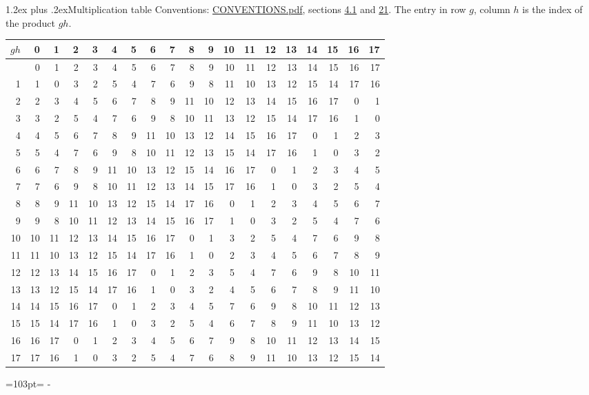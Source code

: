 \documentclass[10pt,a4paper]{article}
\makeatletter
\renewcommand\section{\@startsection{section}{1}{\z@}{-3ex plus -1ex minus -.2ex}%
  {1.2ex plus .2ex}{\normalfont\large\sffamily\bfseries\color{parttitle}}}
\newcommand{\needspace}[1]{\par\penalty-100\begingroup\dimen0=#1\relax\dimen2=\pagegoal
  \advance\dimen2-\pagetotal\ifdim\dimen0>\dimen2\relax\ifdim\dimen2>0pt\vfil\break\fi\fi
  \endgroup}
\numberwithin{equation}{section}
\makeatother
\begin{document}
\section{Multiplication table}\label{s:multiplication}
Conventions: \href{../../CONVENTIONS.pdf}{CONVENTIONS.pdf}, sections \href{../../../rotation/CONVENTIONS.pdf\#conv.4.1}{4.1} and \href{../../CONVENTIONS.pdf\#conv.21}{21}.
The entry in row $g$, column $h$ is the index of the product $gh$.
{\normalsize\setlength{\tabcolsep}{0.1em}\setlength{\LTleft}{-8pt plus 1fill}\setlength{\LTright}{-8pt plus 1fill}\begin{longtable}{@{}r|rrrrrrrrrrrrrrrrrr@{}}\toprule
$gh$ & 0 & 1 & 2 & 3 & 4 & 5 & 6 & 7 & 8 & 9 & 10 & 11 & 12 & 13 & 14 & 15 & 16 & 17\\\midrule\endhead
\bottomrule\endfoot\endlastfoot
0 & 0 & 1 & 2 & 3 & 4 & 5 & 6 & 7 & 8 & 9 & 10 & 11 & 12 & 13 & 14 & 15 & 16 & 17\\*
1 & 1 & 0 & 3 & 2 & 5 & 4 & 7 & 6 & 9 & 8 & 11 & 10 & 13 & 12 & 15 & 14 & 17 & 16\\
2 & 2 & 3 & 4 & 5 & 6 & 7 & 8 & 9 & 11 & 10 & 12 & 13 & 14 & 15 & 16 & 17 & 0 & 1\\
3 & 3 & 2 & 5 & 4 & 7 & 6 & 9 & 8 & 10 & 11 & 13 & 12 & 15 & 14 & 17 & 16 & 1 & 0\\
4 & 4 & 5 & 6 & 7 & 8 & 9 & 11 & 10 & 13 & 12 & 14 & 15 & 16 & 17 & 0 & 1 & 2 & 3\\
5 & 5 & 4 & 7 & 6 & 9 & 8 & 10 & 11 & 12 & 13 & 15 & 14 & 17 & 16 & 1 & 0 & 3 & 2\\
6 & 6 & 7 & 8 & 9 & 11 & 10 & 13 & 12 & 15 & 14 & 16 & 17 & 0 & 1 & 2 & 3 & 4 & 5\\
7 & 7 & 6 & 9 & 8 & 10 & 11 & 12 & 13 & 14 & 15 & 17 & 16 & 1 & 0 & 3 & 2 & 5 & 4\\
8 & 8 & 9 & 11 & 10 & 13 & 12 & 15 & 14 & 17 & 16 & 0 & 1 & 2 & 3 & 4 & 5 & 6 & 7\\
9 & 9 & 8 & 10 & 11 & 12 & 13 & 14 & 15 & 16 & 17 & 1 & 0 & 3 & 2 & 5 & 4 & 7 & 6\\
10 & 10 & 11 & 12 & 13 & 14 & 15 & 16 & 17 & 0 & 1 & 3 & 2 & 5 & 4 & 7 & 6 & 9 & 8\\
11 & 11 & 10 & 13 & 12 & 15 & 14 & 17 & 16 & 1 & 0 & 2 & 3 & 4 & 5 & 6 & 7 & 8 & 9\\
12 & 12 & 13 & 14 & 15 & 16 & 17 & 0 & 1 & 2 & 3 & 5 & 4 & 7 & 6 & 9 & 8 & 10 & 11\\
13 & 13 & 12 & 15 & 14 & 17 & 16 & 1 & 0 & 3 & 2 & 4 & 5 & 6 & 7 & 8 & 9 & 11 & 10\\
14 & 14 & 15 & 16 & 17 & 0 & 1 & 2 & 3 & 4 & 5 & 7 & 6 & 9 & 8 & 10 & 11 & 12 & 13\\
15 & 15 & 14 & 17 & 16 & 1 & 0 & 3 & 2 & 5 & 4 & 6 & 7 & 8 & 9 & 11 & 10 & 13 & 12\\
16 & 16 & 17 & 0 & 1 & 2 & 3 & 4 & 5 & 6 & 7 & 9 & 8 & 10 & 11 & 12 & 13 & 14 & 15\\*
17 & 17 & 16 & 1 & 0 & 3 & 2 & 5 & 4 & 7 & 6 & 8 & 9 & 11 & 10 & 13 & 12 & 15 & 14\\
\bottomrule\end{longtable}}
\needspace{103pt}
\end{document}
